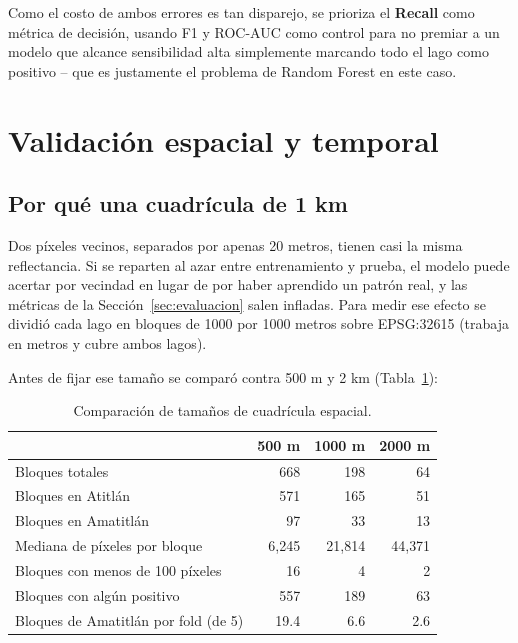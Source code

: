 \documentclass[11pt]{article}
\begin{document}
Como el costo de ambos errores es tan disparejo, se prioriza el \textbf{Recall} como métrica de decisión, usando F1 y ROC-AUC como control para no premiar a un modelo que alcance sensibilidad alta simplemente marcando todo el lago como positivo -- que es justamente el problema de Random Forest en este caso.

\section{Validación espacial y temporal}
\label{sec:validacion}

\subsection{Por qué una cuadrícula de 1 km}

Dos píxeles vecinos, separados por apenas 20 metros, tienen casi la misma reflectancia. Si se reparten al azar entre entrenamiento y prueba, el modelo puede acertar por vecindad en lugar de por haber aprendido un patrón real, y las métricas de la Sección~\ref{sec:evaluacion} salen infladas. Para medir ese efecto se dividió cada lago en bloques de 1000 por 1000 metros sobre EPSG:32615 (trabaja en metros y cubre ambos lagos).

Antes de fijar ese tamaño se comparó contra 500 m y 2 km (Tabla~\ref{tab:tamano_bloques}):

\begin{table}[H]
\centering
\small
\caption{Comparación de tamaños de cuadrícula espacial.}
\label{tab:tamano_bloques}
\begin{tabular}{lrrr}
\toprule
 & 500 m & 1000 m & 2000 m \\
\midrule
Bloques totales & 668 & 198 & 64 \\
Bloques en Atitlán & 571 & 165 & 51 \\
Bloques en Amatitlán & 97 & 33 & 13 \\
Mediana de píxeles por bloque & 6{,}245 & 21{,}814 & 44{,}371 \\
Bloques con menos de 100 píxeles & 16 & 4 & 2 \\
Bloques con algún positivo & 557 & 189 & 63 \\
Bloques de Amatitlán por fold (de 5) & 19.4 & 6.6 & 2.6 \\
\bottomrule
\end{tabular}
\end{table}
\end{document}
